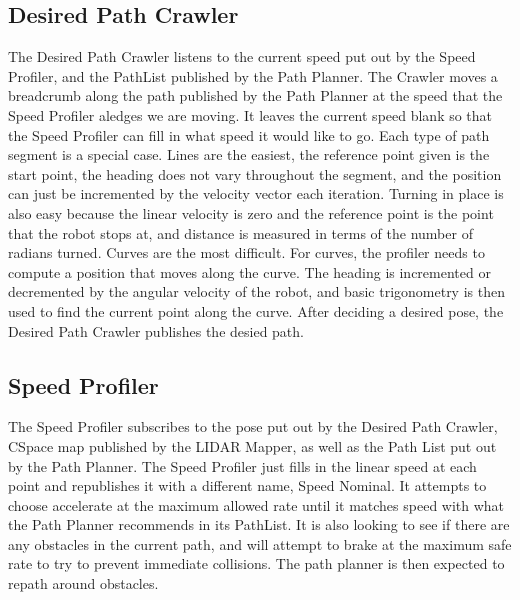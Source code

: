 \documentclass{article}
\begin{document}


\subsection{Desired Path Crawler}

The Desired Path Crawler listens to the current speed put out by the Speed Profiler, and the PathList published by the Path Planner.
The Crawler moves a breadcrumb along the path published by the Path Planner at the speed that the Speed Profiler aledges we are moving.
It leaves the current speed blank so that the Speed Profiler can fill in what speed it would like to go.
Each type of path segment is a special case.
Lines are the easiest, the reference point given is the start point, the heading does not vary throughout the segment, and the position can just be incremented by the velocity vector each iteration.
Turning in place is also easy because the linear velocity is zero and the reference point is the point that the robot stops at, and distance is measured in terms of the number of radians turned.
Curves are the most difficult. 
For curves, the profiler needs to compute a position that moves along the curve. 
The heading is incremented or decremented by the angular velocity of the robot, and basic trigonometry is then used to find the current point along the curve.
After deciding a desired pose, the Desired Path Crawler publishes the desied path.



\subsection{Speed Profiler}

The Speed Profiler subscribes to the pose put out by the Desired Path Crawler, CSpace map published by the LIDAR Mapper, as well as the Path List put out by the Path Planner.
The Speed Profiler just fills in the linear speed at each point and republishes it with a different name, Speed Nominal.
It attempts to choose accelerate at the maximum allowed rate until it matches speed with what the Path Planner recommends in its PathList.
It is also looking to see if there are any obstacles in the current path, and will attempt to brake at the maximum safe rate to try to prevent immediate collisions.
The path planner is then expected to repath around obstacles.
\end{document}
